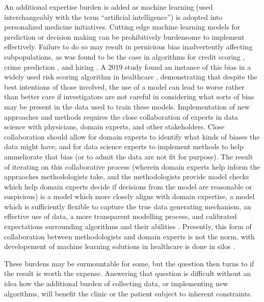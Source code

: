 An additional expertise burden is added as machine learning (used interchangeably with the term “artificial intelligence”) is adopted into personalized medicine initiatives.  Cutting edge machine learning models for prediction or decision making can be prohibitively burdensome to implement effectively. Failure to do so may result in pernicious bias inadvertently affecting subpopulations, as was found to be the case in algorithms for credit scoring \cite{barocas2016big}, crime prediction \cite{lum2016predict}, and hiring \cite{ajunwa2020paradox}.  A 2019 study found an instance of this bias in a widely used risk scoring algorithm in healthcare \cite{obermeyer2019dissecting}, demonstrating that despite the best intentions of those involved, the use of a model can lead to worse rather than better care if investigators are not careful in considering what sorts of bias may be present in the data used to train these models.  Implementation of new approaches and methods requires the close collaboration of experts in data science  with physicians, domain experts, and other stakeholders.  Close collaboration should allow for domain experts to identify what kinds of biases the data might have, and for data science experts to implement methods to help ammeliorate that bias (or to admit the data are not fit for purpose).  The result of iterating on this collaborative process (wherein domain experts help inform the appraoches methodologists take, and the methodologists provide model checks which help domain experts decide if decisions from the model are reasonable or suspicious) is a model which more closely aligns with domain expertise, a model which is sufficiently flexible to capture the true data generating mechanism, an effective use of data, a more transparent modelling process, and calibrated expectations surrounding algorithms and their abilities \cite{frohlich2018hype}.  Presently, this form of collaboration between methodologists and domain experts is not the norm, with developement of machine learning solutions in healthcare is done in silos \cite{wiens2019no}.

These burdens may be surmountable for some, but the question then turns to if the result is worth the expense.  Answering that question is difficult without an idea how the additional burden of collecting data, or implementing new algorithms, will benefit the clinic or the patient subject to inherent constraints. 

